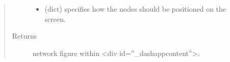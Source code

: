 \documentclass[letterpaper,10pt,english]{sphinxmanual}
\begin{document}
\begin{fulllineitems}
\begin{quote}
\begin{description}
\begin{itemize}
\item {} 
 (dict) \textendash{} specifies how the nodes should be positioned on the screen.

\end{itemize}

\item[{Returns}] \leavevmode
network figure within \textless{}div id=”\_dash\sphinxhyphen{}app\sphinxhyphen{}content”\textgreater{}.

\end{description}\end{quote}

\end{fulllineitems}

\end{document}
